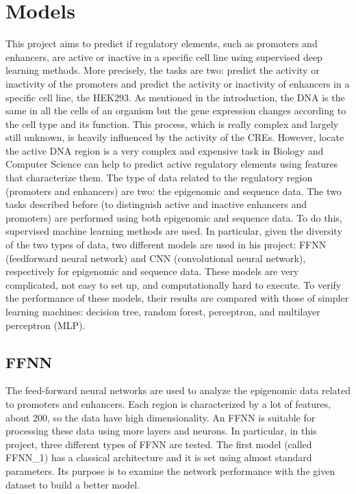 \section{Models}

This project aims to predict if regulatory elements, such as promoters
and enhancers, are active or inactive in a specific cell line using
supervised deep learning methods. More precisely, the tasks are two:
predict the activity or inactivity of the promoters and predict the
activity or inactivity of enhancers in a specific cell line, the HEK293.
As mentioned in the introduction, the DNA is the same in all the cells
of an organism but the gene expression changes according to the cell
type and its function. This process, which is really complex and largely
still unknown, is heavily influenced by the activity of the CREs.
However, locate the active DNA region is a very complex and expensive
task in Biology and Computer Science can help to predict active
regulatory elements using features that characterize them. The type of
data related to the regulatory region (promoters and enhancers) are two:
the epigenomic and sequence data. The two tasks described before (to
distinguish active and inactive enhancers and promoters) are performed
using both epigenomic and sequence data. To do this, supervised machine
learning methods are used. In particular, given the diversity of the two
types of data, two different models are used in his project: FFNN
(feedforward neural network) and CNN (convolutional neural network),
respectively for epigenomic and sequence data. These models are very
complicated, not easy to set up, and computationally hard to execute. To
verify the performance of these models, their results are compared with
those of simpler learning machines: decision tree, random forest,
perceptron, and multilayer perceptron (MLP).

\subsection{FFNN}

The feed-forward neural networks are used to analyze the epigenomic data
related to promoters and enhancers. Each region is characterized by a
lot of features, about 200, so the data have high dimensionality. An
FFNN is suitable for processing these data using more layers and
neurons. In particular, in this project, three different types of FFNN
are tested. The first model (called FFNN\_1) has a classical
architecture and it is set using almost standard parameters. Its purpose
is to examine the network performance with the given dataset to build a
better model.

